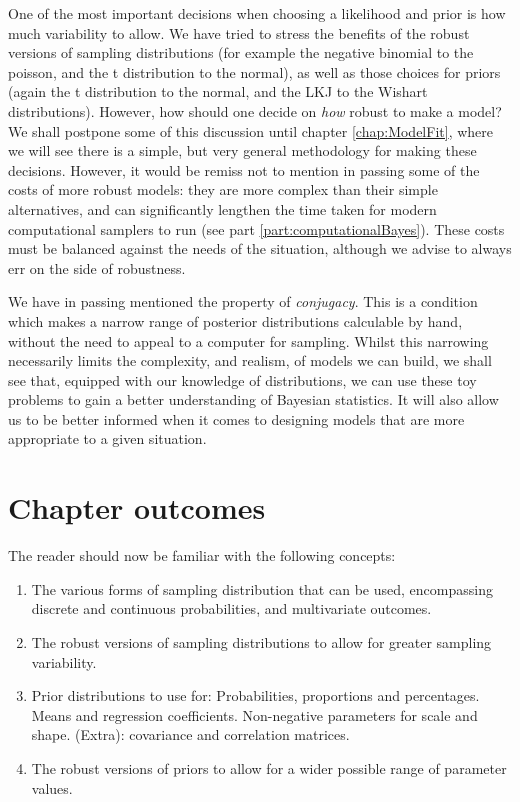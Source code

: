\documentclass[11pt,fullpage]{book}
\begin{document}
One of the most important decisions when choosing a likelihood and prior is how much variability to allow. We have tried to stress the benefits of the robust versions of sampling distributions (for example the negative binomial to the poisson, and the t distribution to the normal), as well as those choices for priors (again the t distribution to the normal, and the LKJ to the Wishart distributions). However, how should one decide on \textit{how} robust to make a model? We shall postpone some of this discussion until chapter \ref{chap:ModelFit}, where we will see there is a simple, but very general methodology for making these decisions. However, it would be remiss not to mention in passing some of the costs of more robust models: they are more complex than their simple alternatives, and can significantly lengthen the time taken for modern computational samplers to run (see part \ref{part:computationalBayes}). These costs must be balanced against the needs of the situation, although we advise to always err on the side of robustness. 

We have in passing mentioned the property of \textit{conjugacy}. This is a condition which makes a narrow range of posterior distributions calculable by hand, without the need to appeal to a computer for sampling. Whilst this narrowing necessarily limits the complexity, and realism, of models we can build, we shall see that, equipped with our knowledge of distributions, we can use these toy problems to gain a better understanding of Bayesian statistics. It will also allow us to be better informed when it comes to designing models that are more appropriate to a given situation.

\section{Chapter outcomes}
The reader should now be familiar with the following concepts:

\begin{enumerate}
\item The various forms of sampling distribution that can be used, encompassing discrete and continuous probabilities, and multivariate outcomes.
\item The robust versions of sampling distributions to allow for greater sampling variability.
\item Prior distributions to use for: 
\subitem Probabilities, proportions and percentages.
\subitem Means and regression coefficients.
\subitem Non-negative parameters for scale and shape.
\subitem (Extra): covariance and correlation matrices.
\item The robust versions of priors to allow for a wider possible range of parameter values.
\end{enumerate}
\end{document}
